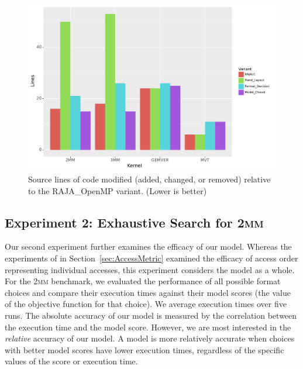 \documentclass[sigconf]{acmart}
\begin{document}
\begin{figure}
	\includegraphics[width=\columnwidth]{PolybenchSLOC.pdf}
	\caption{Source lines of code modified (added, changed, or removed) relative to the RAJA\_OpenMP variant. (Lower is better)}
	\label{PolybenchSLOC}  
\end{figure}


\subsection{Experiment 2: Exhaustive Search for \textsc{2mm}}

Our second experiment further examines the efficacy of our model. 
Whereas the experiments of in Section~\ref{sec:AccessMetric} examined the efficacy of access order representing individual accesses, this experiment considers the model as a whole.
For the \textsc{2mm} benchmark, we evaluated the performance of all possible format choices and compare their execution times against their model scores (the value of the objective function for that choice).
We average execution times over five runs.
The absolute accuracy of our model is measured by the correlation between the execution time and the model score.
However, we are most interested in the \textit{relative} accuracy of our model.
A model is more relatively accurate when choices with better model scores have lower execution times, regardless of the specific values of the score or execution time.
\end{document}
